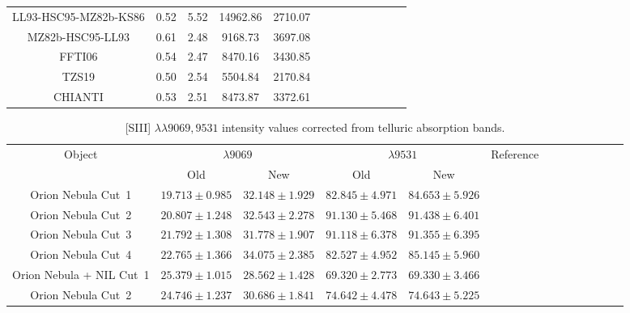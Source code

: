 \documentclass[fleqn,usenatbib]{mnras}
\begin{document}
\begin{table}
\begin{tabular}{ccccccccccccc}
LL93-HSC95-MZ82b-KS86 &0.52& 5.52&14962.86&2710.07\\

MZ82b-HSC95-LL93  & 0.61 & 2.48 &9168.73&3697.08\\

FFTI06 &0.54& 2.47&8470.16&3430.85\\

TZS19 & 0.50 & 2.54&5504.84&2170.84\\

CHIANTI & 0.53 & 2.51&8473.87&3372.61\\

\hline
\end{tabular}
\end{table}

\begin{table}
\centering
\caption{[S\thinspace III] $\lambda \lambda 9069, 9531$ intensity values corrected from telluric absorption bands.}
\label{tab:tellabs}
\begin{tabular}{ccccccccccccc}
\hline
Object &   \multicolumn{2}{c}{$\lambda 9069$} & \multicolumn{2}{c}{$\lambda 9531$} & Reference\\
 & Old & New  & Old & New & \\
\hline

Orion Nebula Cut~1 & $19.713 \pm 0.985$ & $32.148\pm 1.929$& $82.845 \pm 4.971$ & $84.653 \pm 5.926$ & \multirow{4}{*}{\citet{mendez2021}}\\

Orion Nebula Cut~2 & $20.807 \pm 1.248$ &  $32.543 \pm 2.278$& $91.130\pm 5.468$&$91.438 \pm 6.401 $\\

Orion Nebula Cut~3 & $21.792\pm 1.308$ & $31.778\pm 1.907$& $91.118\pm 6.378$&$91.355 \pm 6.395$\\

Orion Nebula Cut~4 &$22.765 \pm 1.366$ & $ 34.075 \pm 2.385$ & $82.527\pm 4.952$ & $85.145\pm5.960$\\


Orion Nebula + NIL Cut~1 & $25.379\pm 1.015$ & $28.562\pm 1.428$ & $ 69.320 \pm 2.773$ & $69.330 \pm 3.466$ & \multirow{2}{*}{\citet{mendez2021-2}}\\

Orion Nebula Cut~2 & $24.746\pm 1.237$ & $30.686\pm 1.841$ & $74.642\pm 4.478$ & $74.643\pm 5.225$ \\


\end{tabular}
\end{table}
\end{document}
